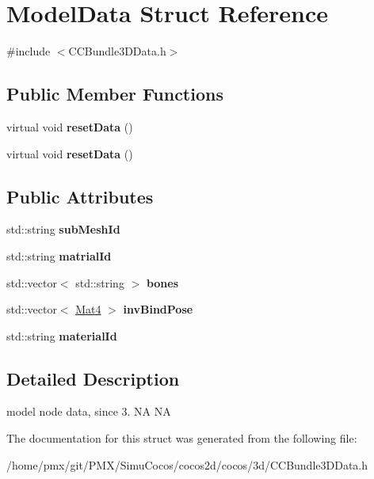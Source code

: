 \hypertarget{structModelData}{}\section{Model\+Data Struct Reference}
\label{structModelData}


{\ttfamily \#include $<$C\+C\+Bundle3\+D\+Data.\+h$>$}

\subsection*{Public Member Functions}
\begin{DoxyCompactItemize}
\item 
\mbox{\label{structModelData_a64151ad21547b1ded75a3fb7dd3468c5}} 
virtual void {\bfseries reset\+Data} ()
\item 
\mbox{\label{structModelData_a64151ad21547b1ded75a3fb7dd3468c5}} 
virtual void {\bfseries reset\+Data} ()
\end{DoxyCompactItemize}
\subsection*{Public Attributes}
\begin{DoxyCompactItemize}
\item 
\mbox{\label{structModelData_a932b81d85c77e2bf477492d0c1fa38af}} 
std\+::string {\bfseries sub\+Mesh\+Id}
\item 
\mbox{\label{structModelData_ad5cff70f8624876f7efd2ae9ab6e76e1}} 
std\+::string {\bfseries matrial\+Id}
\item 
\mbox{\label{structModelData_a05ebef5c31f30e7ef23df51850af2211}} 
std\+::vector$<$ std\+::string $>$ {\bfseries bones}
\item 
\mbox{\label{structModelData_a5e48f53692510a199acda0caac219064}} 
std\+::vector$<$ \hyperlink{classMat4}{Mat4} $>$ {\bfseries inv\+Bind\+Pose}
\item 
\mbox{\label{structModelData_a26f62e768cfc873b7f9ac0beeb16b932}} 
std\+::string {\bfseries material\+Id}
\end{DoxyCompactItemize}


\subsection{Detailed Description}
model node data, since 3.  NA  NA 

The documentation for this struct was generated from the following file\+:\begin{DoxyCompactItemize}
\item 
/home/pmx/git/\+P\+M\+X/\+Simu\+Cocos/cocos2d/cocos/3d/C\+C\+Bundle3\+D\+Data.\+h\end{DoxyCompactItemize}
